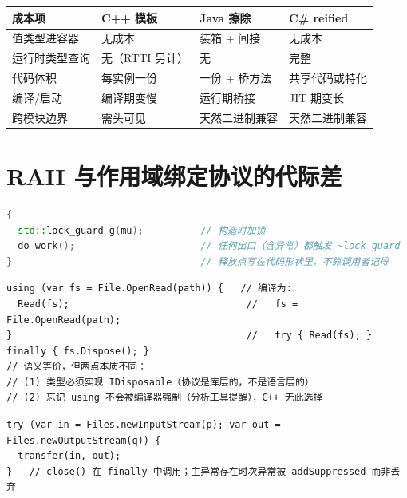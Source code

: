 \documentclass[12pt,a4paper,fontset=fandol]{ctexbook}
\begin{document}
\begin{compare}[title=泛型三路线的成本分配]
\begin{tabular}{@{}p{}p{}p{}p{}@{}}
\toprule
\textbf{成本项} & \textbf{C++ 模板} & \textbf{Java 擦除} & \textbf{C\# reified} \\
\midrule
值类型进容器 & 无成本 & 装箱 + 间接 & 无成本 \\
运行时类型查询 & 无（RTTI 另计） & 无 & 完整 \\
代码体积 & 每实例一份 & 一份 + 桥方法 & 共享代码或特化 \\
编译/启动 & 编译期变慢 & 运行期桥接 & JIT 期变长 \\
跨模块边界 & 需头可见 & 天然二进制兼容 & 天然二进制兼容 \\
\bottomrule
\end{tabular}
\end{compare}

\section{RAII 与作用域绑定协议的代际差}

\begin{lstlisting}[language=C++,caption={C++：获取即初始化，释放挂在作用域语法上}]
{
  std::lock_guard g(mu);          // 构造时加锁
  do_work();                      // 任何出口（含异常）都触发 ~lock_guard
}                                 // 释放点写在代码形状里，不靠调用者记得
\end{lstlisting}

\begin{lstlisting}[style=csharpstyle,caption={C\#：using 是语法糖，糖纸下是 try/finally}]
using (var fs = File.OpenRead(path)) {   // 编译为:
  Read(fs);                               //   fs = File.OpenRead(path);
}                                         //   try { Read(fs); } finally { fs.Dispose(); }
// 语义等价，但两点本质不同：
// (1) 类型必须实现 IDisposable（协议是库层的，不是语言层的）
// (2) 忘记 using 不会被编译器强制（分析工具提醒），C++ 无此选择
\end{lstlisting}

\begin{lstlisting}[style=javastyle,caption={Java try-with-resources：同族方案，异常抑制规则另有细节}]
try (var in = Files.newInputStream(p); var out = Files.newOutputStream(q)) {
  transfer(in, out);
}   // close() 在 finally 中调用；主异常存在时次异常被 addSuppressed 而非丢弃
\end{lstlisting}
\end{document}
